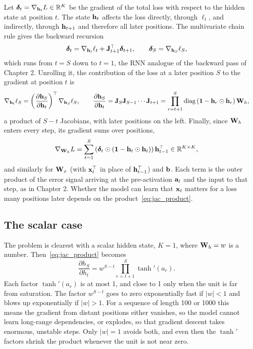 Let $\boldsymbol{\delta}_t=\nabla_{\mathbf{h}_t}L\in\mathbb{R}^K$ be the gradient of the total loss with respect to the hidden state at position $t$. The state $\mathbf{h}_t$ affects the loss directly, through $\ell_t$, and indirectly, through $\mathbf{h}_{t+1}$ and therefore all later positions. The multivariate chain rule gives the backward recursion
\begin{equation}
  \boldsymbol{\delta}_t = \nabla_{\mathbf{h}_t}\ell_t + \mathbf{J}_{t+1}^\top\boldsymbol{\delta}_{t+1}, \qquad \boldsymbol{\delta}_S=\nabla_{\mathbf{h}_S}\ell_S ,
  \label{eq:bptt}
\end{equation}
which runs from $t=S$ down to $t=1$, the RNN analogue of the backward pass of Chapter 2. Unrolling it, the contribution of the loss at a later position $S$ to the gradient at position $t$ is
\begin{equation}
  \nabla_{\mathbf{h}_t}\ell_S = \left(\frac{\partial\mathbf{h}_S}{\partial\mathbf{h}_t}\right)^\top\nabla_{\mathbf{h}_S}\ell_S,
  \qquad
  \frac{\partial\mathbf{h}_S}{\partial\mathbf{h}_t} = \mathbf{J}_S\mathbf{J}_{S-1}\cdots\mathbf{J}_{t+1} = \prod_{r=t+1}^{S}\operatorname{diag}\left(\mathbf{1}-\mathbf{h}_r\odot\mathbf{h}_r\right)\mathbf{W}_h ,
  \label{eq:jac_product}
\end{equation}
a product of $S-t$ Jacobians, with later positions on the left. Finally, since $\mathbf{W}_h$ enters every step, its gradient sums over positions,
\begin{equation}
  \nabla_{\mathbf{W}_h}L = \sum_{t=1}^{S}\left(\boldsymbol{\delta}_t\odot(\mathbf{1}-\mathbf{h}_t\odot\mathbf{h}_t)\right)\mathbf{h}_{t-1}^\top \in\mathbb{R}^{K\times K},
\end{equation}
and similarly for $\mathbf{W}_x$ (with $\mathbf{x}_t^\top$ in place of $\mathbf{h}_{t-1}^\top$) and $\mathbf{b}$. Each term is the outer product of the error signal arriving at the pre-activation $\mathbf{a}_t$ and the input to that step, as in Chapter 2. Whether the model can learn that $\mathbf{x}_t$ matters for a loss many positions later depends on the product~\eqref{eq:jac_product}.

\subsection{The scalar case}

The problem is clearest with a scalar hidden state, $K=1$, where $\mathbf{W}_h=w$ is a number. Then~\eqref{eq:jac_product} becomes
\begin{equation}
  \frac{\partial h_S}{\partial h_t} = w^{S-t}\prod_{r=t+1}^{S}\tanh'(a_r) .
\end{equation}
Each factor $\tanh'(a_r)$ is at most 1, and close to 1 only when the unit is far from saturation. The factor $w^{S-t}$ goes to zero exponentially fast if $|w|<1$ and blows up exponentially if $|w|>1$. For a sequence of length 100 or 1000 this means the gradient from distant positions either vanishes, so the model cannot learn long-range dependencies, or explodes, so that gradient descent takes enormous, unstable steps. Only $|w|=1$ avoids both, and even then the $\tanh'$ factors shrink the product whenever the unit is not near zero.

